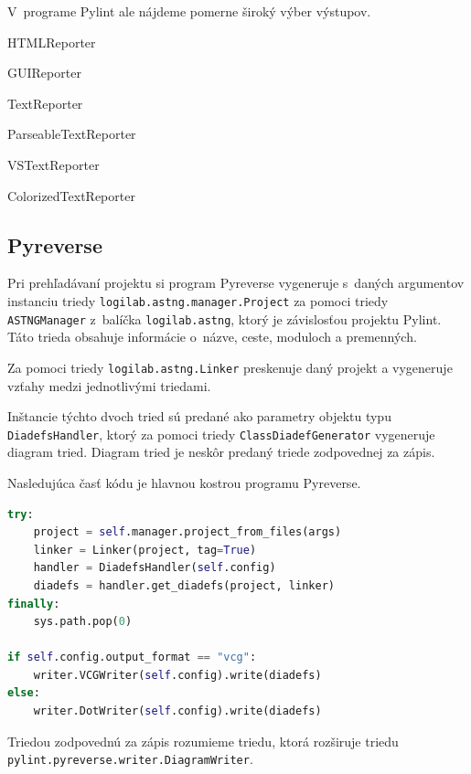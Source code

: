 \documentclass[11pt,oneside,final]{fithesis2}
\begin{document}
\begin{list}{•}{}
		V~programe Pylint ale nájdeme pomerne široký výber výstupov.
		
			    \begin{list}{•}{}
					\item HTMLReporter
					\item GUIReporter
					\item TextReporter
					\item ParseableTextReporter
					\item VSTextReporter
					\item ColorizedTextReporter
    			\end{list}
		
    \end{list}
		
	\subsection{Pyreverse}
	Pri prehľadávaní projektu si program Pyreverse vygeneruje s~daných argumentov instanciu triedy \texttt{logilab.astng.manager.Project} za pomoci triedy \texttt{ASTNGManager} z~balíčka \texttt{logilab.astng}, ktorý je závislosťou projektu Pylint.
	Táto trieda obsahuje informácie o~názve, ceste, moduloch a premenných.
	
		Za pomoci triedy \texttt{logilab.astng.Linker} preskenuje daný projekt a vygeneruje vzťahy medzi jednotlivými triedami.
	
		Inštancie týchto dvoch tried sú predané ako parametry objektu typu \texttt{DiadefsHandler}, ktorý za pomoci triedy \texttt{ClassDiadefGenerator} vygeneruje diagram tried. Diagram tried je neskôr predaný triede zodpovednej za zápis.
		
		Nasledujúca časť kódu je hlavnou kostrou programu Pyreverse.
		
\begin{lstlisting}[language=python]	
try:
    project = self.manager.project_from_files(args)
    linker = Linker(project, tag=True)
    handler = DiadefsHandler(self.config)
    diadefs = handler.get_diadefs(project, linker)
finally:
    sys.path.pop(0)

if self.config.output_format == "vcg":
	writer.VCGWriter(self.config).write(diadefs)
else:
    writer.DotWriter(self.config).write(diadefs)
\end{lstlisting}
		
		
		Triedou zodpovednú za zápis rozumieme triedu, ktorá rozširuje triedu \texttt{pylint.pyreverse.writer.DiagramWriter}.
		
\end{document}
